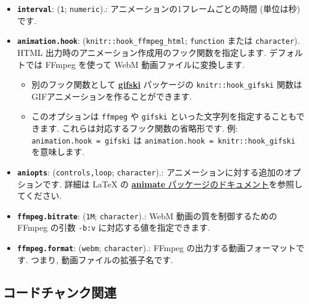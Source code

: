 \documentclass[
  lualatex,ja=standard,jafont=noto-otf]{bxjsreport}
\providecommand{\tightlist}{%
  \setlength{\itemsep}{0pt}\setlength{\parskip}{0pt}}
\begin{document}
\begin{itemize}
\tightlist
\item
  \textbf{\texttt{interval}}: (\texttt{1}; \texttt{numeric}).:
  アニメーションの1フレームごとの時間 (単位は秒) です.
\item
  \textbf{\texttt{animation.hook}}: (\texttt{knitr::hook\_ffmpeg\_html};
  \texttt{function} または \texttt{character}). HTML
  出力時のアニメーション作成用のフック関数を指定します. デフォルトでは
  FFmpeg を使って WebM 動画ファイルに変換します.

  \begin{itemize}
  \tightlist
  \item
    別のフック関数として
    \href{https://cran.r-project.org/package=gifski}{\textbf{gifski}}
    パッケージの \texttt{knitr::hook\_gifski}
    関数はGIFアニメーションを作ることができます.
  \item
    このオプションは \texttt{\textquotesingle{}ffmpeg\textquotesingle{}}
    や \texttt{\textquotesingle{}gifski\textquotesingle{}}
    といった文字列を指定することもできます.
    これらは対応するフック関数の省略形です. 例:
    \texttt{animation.hook\ =\ \textquotesingle{}gifski\textquotesingle{}}
    は \texttt{animation.hook\ =\ knitr::hook\_gifski} を意味します.
  \end{itemize}
\item
  \textbf{\texttt{aniopts}}:
  (\texttt{\textquotesingle{}controls,loop\textquotesingle{}};
  \texttt{character}).: アニメーションに対する追加のオプションです.
  詳細は LaTeX の \href{http://ctan.org/pkg/animate}{\textbf{animate}
  パッケージのドキュメント}を参照してください.
\item
  \textbf{\texttt{ffmpeg.bitrate}}: (\texttt{1M}; \texttt{character}).:
  WebM 動画の質を制御するための FFmpeg の引数 \texttt{-b:v}
  に対応する値を指定できます.
\item
  \textbf{\texttt{ffmpeg.format}}: (\texttt{webm}; \texttt{character}).:
  FFmpeg の出力する動画フォーマットです. つまり,
  動画ファイルの拡張子名です.
\end{itemize}

\hypertarget{code-chunk}{%
\subsection{コードチャンク関連}\label{code-chunk}}
\end{document}
